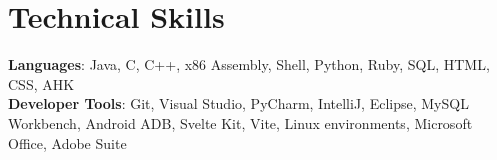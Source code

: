 \documentclass[letterpaper,12pt]{article}
\begin{document}
\section{Technical Skills}
 \begin{itemize}[leftmargin=0.15in, label={}]
    \small{\item{
     \textbf{Languages}{: Java, C, C++, x86 Assembly, Shell, Python, Ruby, SQL, HTML, CSS, AHK} \\
     \textbf{Developer Tools}{: Git, Visual Studio, PyCharm,
IntelliJ, Eclipse, MySQL Workbench, Android ADB, Svelte Kit, Vite, Linux environments, Microsoft Office, Adobe Suite} \\
    }}
 \end{itemize}


\end{document}
